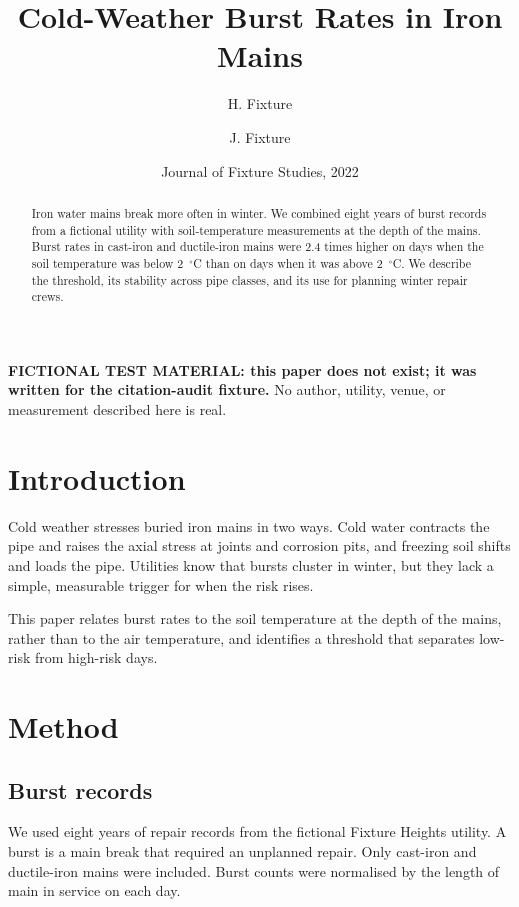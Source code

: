 \documentclass{article}
\title{Cold-Weather Burst Rates in Iron Mains}
\author{H. Fixture \and J. Fixture}
\date{Journal of Fixture Studies, 2022}
\begin{document}
\maketitle

\noindent\textbf{FICTIONAL TEST MATERIAL: this paper does not exist; it was
written for the citation-audit fixture.} No author, utility, venue, or
measurement described here is real.

\begin{abstract}
Iron water mains break more often in winter. We combined eight years of burst
records from a fictional utility with soil-temperature measurements at the
depth of the mains. Burst rates in cast-iron and ductile-iron mains were 2.4
times higher on days when the soil temperature was below 2~$^\circ$C than on
days when it was above 2~$^\circ$C. We describe the threshold, its stability
across pipe classes, and its use for planning winter repair crews.
\end{abstract}

\section{Introduction}
\label{sec:introduction}

Cold weather stresses buried iron mains in two ways. Cold water contracts the
pipe and raises the axial stress at joints and corrosion pits, and freezing
soil shifts and loads the pipe. Utilities know that bursts cluster in winter,
but they lack a simple, measurable trigger for when the risk rises.

This paper relates burst rates to the soil temperature at the depth of the
mains, rather than to the air temperature, and identifies a threshold that
separates low-risk from high-risk days.

\section{Method}
\label{sec:method}

\subsection{Burst records}
\label{sec:method-records}

We used eight years of repair records from the fictional Fixture Heights
utility. A burst is a main break that required an unplanned repair. Only
cast-iron and ductile-iron mains were included. Burst counts were normalised by
the length of main in service on each day.
\end{document}

